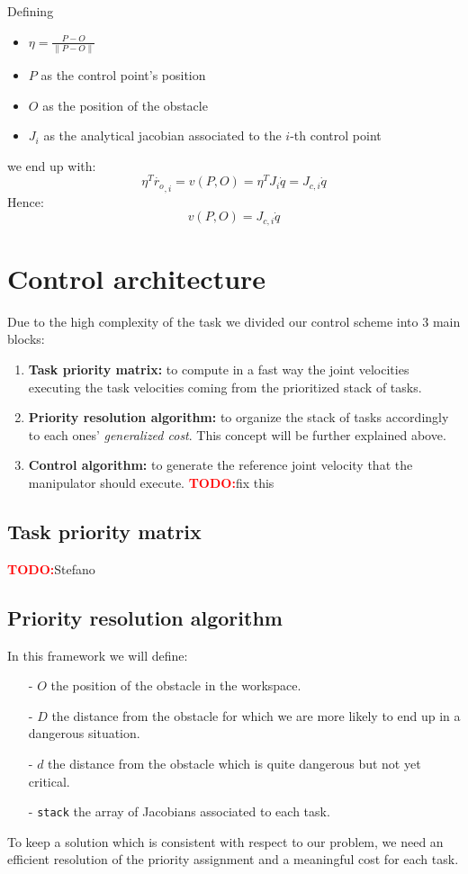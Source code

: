 \documentclass[12pt,a4paper, twocolumn, twoside]{article}
\newcommand{\todo}{\textcolor{red}{\textbf{TODO:}}}
\begin{document}
Defining 
\begin{itemize}
	\item $\eta = \frac{P - O}{\lVert P-O \rVert}$
	\item $P$ as the control point's position
	\item $O$ as the position of the obstacle
	\item $J_i$ as the analytical jacobian associated to the $i$-th control point
\end{itemize}
we end up with:
\begin{equation*}
\eta^T\dot{r_{o}}_{,i} = v(P,O) =\eta^T J_i\dot{q} = J_{c,i}\dot{q}
\end{equation*}
Hence:
\begin{equation}
v(P,O) = J_{c,i}\dot{q}
\end{equation}

\section{Control architecture}
Due to the high complexity of the task we divided our control scheme into 3 main blocks:
\begin{enumerate}
	\item \textbf{Task priority matrix:} to compute in a fast way the joint velocities executing the task velocities coming from the prioritized stack of tasks.
	\item \textbf{Priority resolution algorithm:} to organize the stack of tasks accordingly to each ones' \textit{generalized cost}.
	This concept will be further explained above.
	\item \textbf{Control algorithm:} to generate the reference joint velocity that the manipulator should execute.
	\todo fix this
\end{enumerate}

\subsection{Task priority matrix}
\todo Stefano
\subsection{Priority resolution algorithm}
In this framework we will define:
\begin{enumerate}
\item[-] $O$ the position of the obstacle in the workspace.
\item[-] $D$ the distance from the obstacle for which we are more likely to end up in a dangerous situation.
\item[-] $d$ the distance from the obstacle which is quite dangerous but not yet critical.
\item[-] \texttt{stack} the array of Jacobians associated to each task.
\end{enumerate}
To keep a solution which is consistent with respect to our problem, we need an efficient resolution of the priority assignment and a meaningful cost for each task.
\end{document}
